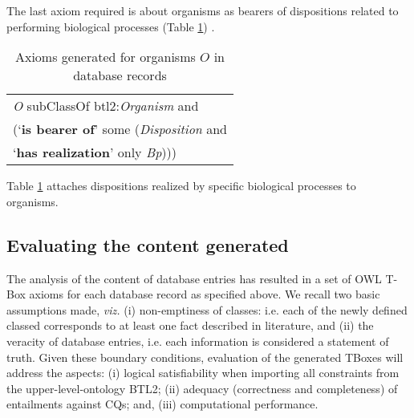 The last axiom required is about organisms as bearers of dispositions related to performing biological processes (Table \ref{table:Organism}) .

\begin{table}[H]
	\caption{Axioms generated for organisms  $O$ in database records}
	\label{table:Organism}
	\centering
	\begin{tabular}{p{3in}}
		\hline
			\textit{O} subClassOf btl2:\textit{Organism} and \\
			\hspace{0.5cm} (`\textbf{is bearer of}'  some (\textit{Disposition} and \\
			\hspace{1cm} `\textbf{has realization}' only \textit{Bp}))) \\
		\hline
	\end{tabular}
\end{table}%
\noindent
Table \ref{table:Organism} attaches dispositions realized by specific biological processes to organisms. 

\subsection*{Evaluating the content generated}
\label{sec:evaluation}
The analysis of the content of database entries has resulted in a set of OWL T-Box axioms for each database record as specified above. We recall two basic assumptions made, \textit{viz.} (i) non-emptiness of classes: i.e. each of the newly defined classed corresponds to at least one fact described in literature, and (ii) the veracity of database entries, i.e. each information is considered a statement of truth. Given these boundary conditions, evaluation of the generated TBoxes will address the aspects: (i) logical satisfiability when importing all constraints from the upper-level-ontology BTL2; (ii) adequacy (correctness and completeness) of entailments against CQs; and, (iii) computational performance.

%

